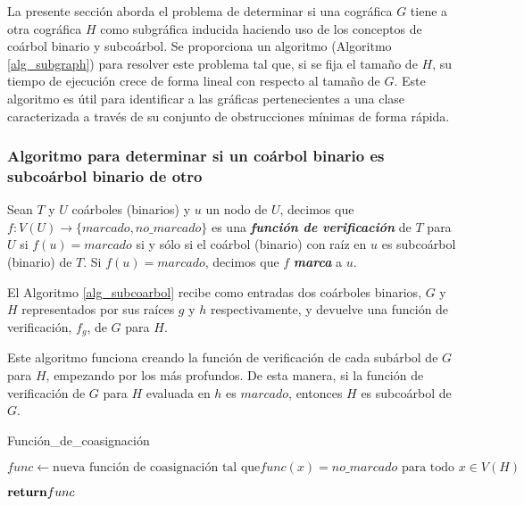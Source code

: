 La presente sección aborda el problema de determinar si una cográfica $G$ tiene a otra cográfica $H$ como subgráfica inducida haciendo uso de los conceptos de coárbol binario y subcoárbol. Se proporciona un algoritmo (Algoritmo \ref{alg_subgraph}) para resolver este problema tal que, si se fija el tamaño de $H$, su tiempo de ejecución crece de forma lineal con respecto al tamaño de $G$. Este algoritmo es útil para identificar a las gráficas pertenecientes a una clase caracterizada a través de su conjunto de obstrucciones mínimas de forma rápida.

\subsubsection{Algoritmo para determinar si un coárbol binario es subcoárbol binario de otro}

\begin{definition}
    Sean $T$ y $U$ coárboles (binarios) y $u$ un nodo de $U$, decimos que $f:V(U)\rightarrow\{marcado, no\_marcado\}$ es una \textbf{\emph{función de verificación}} de $T$ para $U$ si $f(u) = marcado$ si y sólo si el coárbol (binario) con raíz en $u$ es subcoárbol (binario) de $T$. Si $f(u) = marcado$, decimos que $f$ \textbf{\emph{marca}} a $u$.
\end{definition}

El Algoritmo \ref{alg_subcoarbol} recibe como entradas dos coárboles binarios, $G$ y $H$ representados por sus raíces $g$ y $h$ respectivamente, y devuelve una función de verificación, $f_g$, de $G$ para $H$.

Este algoritmo funciona creando la función de verificación de cada subárbol de $G$ para $H$, empezando por los más profundos. De esta manera, si la función de verificación de $G$ para $H$ evaluada en $h$ es $marcado$, entonces  $H$ es subcoárbol de $G$.

\begin{algorithm}[ht!]
\caption{Función\_de\_coasignación}
\label{alg_subcoarbol}
\DontPrintSemicolon %

 $func \gets \text{nueva función de coasignación tal que} func(x)=no\_marcado \text{ para todo } x\in V(H)$\;


$\Return func$

\end{algorithm}

